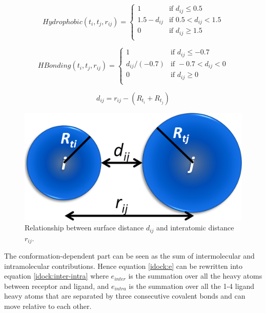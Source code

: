 \begin{equation}
\label{idock:Hydrophobic}
Hydrophobic(t_i, t_j, r_{ij}) =
\begin{cases}
1 & \text{if } d_{ij} \leq 0.5\\
1.5 - d_{ij} & \text{if } 0.5 < d_{ij} < 1.5\\
0 & \text{if } d_{ij} \geq 1.5\\
\end{cases}
\end{equation}

\begin{equation}
\label{idock:HBonding}
HBonding(t_i, t_j, r_{ij}) =
\begin{cases}
1 & \text{if } d_{ij} \leq -0.7\\
d_{ij} / (-0.7) & \text{if } -0.7 < d_{ij} < 0\\
0 & \text{if } d_{ij} \geq 0\\
\end{cases}
\end{equation}

\begin{equation}
\label{idock:dij}
d_{ij} = r_{ij} - (R_{t_i} + R_{t_j})
\end{equation}

\begin{figure}
\centering
\includegraphics[width=\linewidth]{../idock/Distance.png}
\caption{Relationship between surface distance $d_{ij}$ and interatomic distance $r_{ij}$.}
\label{idock:Distance}
\end{figure}

The conformation-dependent part can be seen as the sum of intermolecular and intramolecular contributions. Hence equation \eqref{idock:e} can be rewritten into equation \eqref{idock:inter-intra} where $e_{inter}$ is the summation over all the heavy atoms between receptor and ligand, and $e_{intra}$ is the summation over all the 1-4 ligand heavy atoms that are separated by three consecutive covalent bonds and can move relative to each other.

